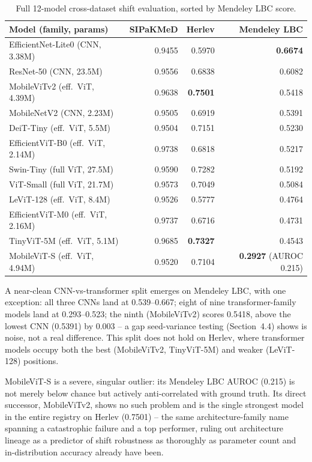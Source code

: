 \documentclass[runningheads]{llncs}
\begin{document}
\begin{table}[htbp]
\centering
\caption{Full 12-model cross-dataset shift evaluation, sorted by Mendeley LBC score.}
\label{tab:rq4-full}
\begin{tabular}{lrrr}
\toprule
Model (family, params) & SIPaKMeD & Herlev & Mendeley LBC \\
\midrule
EfficientNet-Lite0 (CNN, 3.38M) & 0.9455 & 0.5970 & \textbf{0.6674} \\
ResNet-50 (CNN, 23.5M) & 0.9556 & 0.6838 & 0.6082 \\
MobileViTv2 (eff.\ ViT, 4.39M) & 0.9638 & \textbf{0.7501} & 0.5418 \\
MobileNetV2 (CNN, 2.23M) & 0.9505 & 0.6919 & 0.5391 \\
DeiT-Tiny (eff.\ ViT, 5.5M) & 0.9504 & 0.7151 & 0.5230 \\
EfficientViT-B0 (eff.\ ViT, 2.14M) & 0.9738 & 0.6818 & 0.5217 \\
Swin-Tiny (full ViT, 27.5M) & 0.9590 & 0.7282 & 0.5192 \\
ViT-Small (full ViT, 21.7M) & 0.9573 & 0.7049 & 0.5084 \\
LeViT-128 (eff.\ ViT, 8.4M) & 0.9526 & 0.5777 & 0.4764 \\
EfficientViT-M0 (eff.\ ViT, 2.16M) & 0.9737 & 0.6716 & 0.4731 \\
TinyViT-5M (eff.\ ViT, 5.1M) & 0.9685 & \textbf{0.7327} & 0.4543 \\
MobileViT-S (eff.\ ViT, 4.94M) & 0.9520 & 0.7104 & \textbf{0.2927} (AUROC 0.215) \\
\bottomrule
\end{tabular}
\end{table}

A near-clean CNN-vs-transformer split emerges on Mendeley LBC, with one
exception: all three CNNs land at 0.539--0.667; eight of nine
transformer-family models land at 0.293--0.523; the ninth (MobileViTv2)
scores 0.5418, above the lowest CNN (0.5391) by 0.003 -- a gap
seed-variance testing (Section~4.4) shows is noise, not a real
difference. This split does not hold on Herlev, where transformer
models occupy both the best (MobileViTv2, TinyViT-5M) and weaker
(LeViT-128) positions.

MobileViT-S is a severe, singular outlier: its Mendeley LBC AUROC (0.215)
is not merely below chance but actively anti-correlated with ground
truth. Its direct successor, MobileViTv2, shows no such problem and is the
single strongest model in the entire registry on Herlev (0.7501) -- the
same architecture-family name spanning a catastrophic failure and a top
performer, ruling out architecture lineage as a predictor of shift
robustness as thoroughly as parameter count and in-distribution accuracy
already have been.
\end{document}
